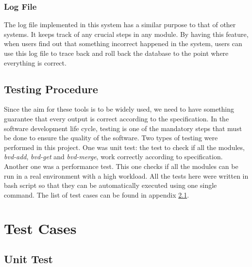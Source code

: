 \documentclass[a4paper,11pt]{kth-mag}
\begin{document}
\subsection{Log File}
\label{sec:log_file}
The log file implemented in this system has a similar purpose to that of other systems. It keeps track of any crucial steps in any module. By having this feature, when users find out that something incorrect happened in the system, users can use this log file to trace back and roll back the database to the point where everything is correct.



\section{Testing Procedure}
Since the aim for these tools is to be widely used, we need to have something guarantee that every output is correct according to the specification. In the software development life cycle, testing is one of the mandatory steps that must be done to ensure the quality of the software. Two types of testing were performed in this project. One was unit test: the test to check if all the modules, \emph{bvd-add}, \emph{bvd-get} and \emph{bvd-merge}, work correctly according to specification. Another one was a performance test. This one checks if all the modules can be run in a real environment with a high workload. All the tests here were written in bash script so that they can be automatically executed using one single command. The list of test cases can be found in appendix \ref{sec:unit_test}.















\appendix
\addappheadtotoc
\chapter{Test Cases}
\label{chap:appendix_test_cases}

\section{Unit Test}
\label{sec:unit_test}
\newcommand{\specialcell}[2][c]{%
  \begin{tabular}[#1]{@{}p{9.9cm}@{}}#2\end{tabular}}
\end{document}

